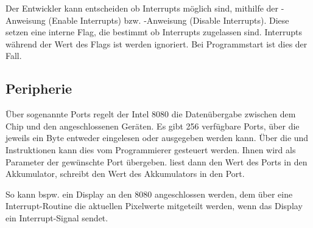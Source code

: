 Der Entwickler kann entscheiden ob Interrupts möglich sind, mithilfe der -Anweisung (Enable Interrupts) bzw. -Anweisung (Disable Interrupts). Diese setzen eine interne Flag, die bestimmt ob Interrupts zugelassen sind. Interrupts während der Wert des Flags  ist werden ignoriert. Bei Programmstart ist dies der Fall.

\subsection{Peripherie}

Über sogenannte Ports regelt der Intel 8080 die Datenübergabe zwischen dem Chip und den angeschlossenen Geräten. 
Es gibt 256 verfügbare Ports, über die jeweils ein Byte entweder eingelesen oder ausgegeben werden kann. Über die  und  Instruktionen kann dies vom Programmierer gesteuert werden. Ihnen wird als Parameter der gewünschte Port übergeben.  liest dann den Wert des Ports in den Akkumulator,  schreibt den Wert des Akkumulators in den Port.

So kann bspw. ein Display an den 8080 angeschlossen werden, dem über eine Interrupt-Routine die aktuellen Pixelwerte mitgeteilt werden, wenn das Display ein Interrupt-Signal sendet.
